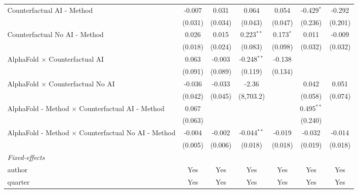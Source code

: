 \begin{tabular}{lcccccc}
   Counterfactual AI - Method                                 & -0.007  & 0.031         & 0.064         & 0.054        & -0.429$^{*}$   & -0.292\\   
                                                              & (0.031) & (0.034)       & (0.043)       & (0.047)      & (0.236)        & (0.201)\\   
   Counterfactual No AI - Method                              & 0.026   & 0.015         & 0.223$^{**}$  & 0.173$^{*}$  & 0.011          & -0.009\\   
                                                              & (0.018) & (0.024)       & (0.083)       & (0.098)      & (0.032)        & (0.032)\\   
   AlphaFold $\times$ Counterfactual AI                       & 0.063   & -0.003        & -0.248$^{**}$ & -0.138       &                &   \\   
                                                              & (0.091) & (0.089)       & (0.119)       & (0.134)      &                &   \\   
   AlphaFold $\times$ Counterfactual No AI                    & -0.036  & -0.033        & -2.36         &              & 0.042          & 0.051\\   
                                                              & (0.042) & (0.045)       & (8,703.2)     &              & (0.058)        & (0.074)\\   
   AlphaFold - Method $\times$ Counterfactual AI - Method     & 0.067   &               &               &              & 0.495$^{**}$   &   \\   
                                                              & (0.063) &               &               &              & (0.240)        &   \\   
   AlphaFold - Method $\times$ Counterfactual No AI - Method  & -0.004  & -0.002        & -0.044$^{**}$ & -0.019       & -0.032         & -0.014\\   
                                                              & (0.005) & (0.006)       & (0.018)       & (0.018)      & (0.019)        & (0.018)\\   
   \midrule
   \emph{Fixed-effects}\\
   author                                                     & Yes     & Yes           & Yes           & Yes          & Yes            & Yes\\  
   quarter                                                    & Yes     & Yes           & Yes           & Yes          & Yes            & Yes\\  

\end{tabular}
